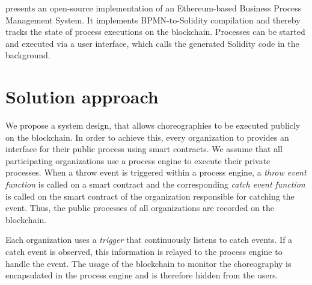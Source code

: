 \documentclass[runningheads]{llncs}
\begin{document}


\cite{lopez2017caterpillar} presents an open-source implementation of an Ethereum-based Business Process Management System.
It implements BPMN-to-Solidity compilation and thereby tracks the state of process executions on the blockchain.
Processes can be started and executed via a user interface, which calls the generated Solidity code in the background.


\section{Solution approach}
We propose a system design, that allows choreographies to be executed publicly on the blockchain.
In order to achieve this, every organization to provides an interface for their public process using smart contracts.
We assume that all participating organizations use a process engine to execute their private processes.
When a throw event is triggered within a process engine, a \emph{throw event function} is called on a smart contract and the corresponding \emph{catch event function} is called on the smart contract of the organization responsible for catching the event.
Thus, the public processes of all organizations are recorded on the blockchain.

Each organization uses a \emph{trigger} that continuously listens to catch events.
If a catch event is observed, this information is relayed to the process engine to handle the event.
The usage of the blockchain to monitor the choreography is encapsulated in the process engine and is therefore hidden from the users.




\end{document}
